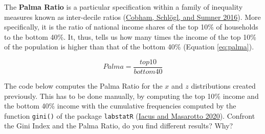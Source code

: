 \documentclass[
]{article}
\begin{document}
The \textbf{Palma Ratio} is a particular specification within a family of
inequality measures known as inter-decile ratios (\protect\hyperlink{ref-cobham2016}{Cobham, Schlögl, and Sumner 2016}). More
specifically, it is the ratio of national income shares of the top 10\%
of households to the bottom 40\%. It, thus, tells us how many times the
income of the top 10\% of the population is higher than that of the
bottom 40\% (Equation \eqref{eq:palma}).

\begin{equation}
Palma = \frac {top10}{bottom40}
\label{eq:palma}
\end{equation}

The code below computes the Palma Ratio for the \(x\) and \(z\)
distributions created previously. This has to be done manually, by
computing the top 10\% income and the bottom 40\% income with the
cumulative frequencies computed by the function \texttt{gini()} of the package
\texttt{labstatR} (\protect\hyperlink{ref-iacus2020}{Iacus and Masarotto 2020}). Confront the Gini Index and the Palma Ratio, do
you find different results? Why?
\end{document}
